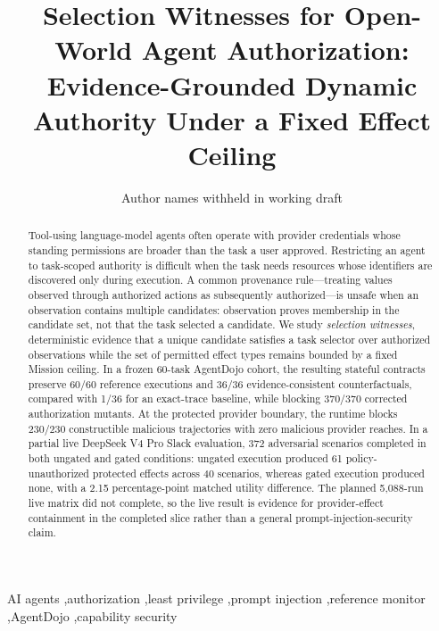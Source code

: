 \documentclass[5p,times,twocolumn]{elsarticle}
\begin{document}
\begin{frontmatter}

\title{Selection Witnesses for Open-World Agent Authorization:\\Evidence-Grounded Dynamic Authority Under a Fixed Effect Ceiling}

\author{Author names withheld in working draft}
\address{NullSquare}

\begin{abstract}
Tool-using language-model agents often operate with provider credentials whose standing permissions are broader than the task a user approved. Restricting an agent to task-scoped authority is difficult when the task needs resources whose identifiers are discovered only during execution. A common provenance rule---treating values observed through authorized actions as subsequently authorized---is unsafe when an observation contains multiple candidates: observation proves membership in the candidate set, not that the task selected a candidate. We study \emph{selection witnesses}, deterministic evidence that a unique candidate satisfies a task selector over authorized observations while the set of permitted effect types remains bounded by a fixed Mission ceiling. In a frozen 60-task AgentDojo cohort, the resulting stateful contracts preserve 60/60 reference executions and 36/36 evidence-consistent counterfactuals, compared with 1/36 for an exact-trace baseline, while blocking 370/370 corrected authorization mutants. At the protected provider boundary, the runtime blocks 230/230 constructible malicious trajectories with zero malicious provider reaches. In a partial live DeepSeek V4 Pro Slack evaluation, 372 adversarial scenarios completed in both ungated and gated conditions: ungated execution produced 61 policy-unauthorized protected effects across 40 scenarios, whereas gated execution produced none, with a 2.15 percentage-point matched utility difference. The planned 5,088-run live matrix did not complete, so the live result is evidence for provider-effect containment in the completed slice rather than a general prompt-injection-security claim.
\end{abstract}

\begin{keyword}
AI agents \sep authorization \sep least privilege \sep prompt injection \sep reference monitor \sep AgentDojo \sep capability security
\end{keyword}

\end{frontmatter}
\end{document}
